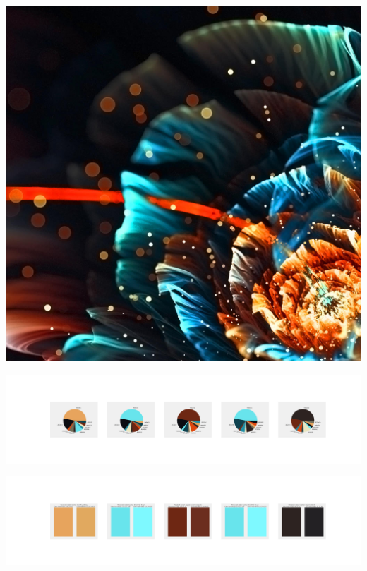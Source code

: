 \documentclass[11pt]{article}
\begin{document}
\begin{landscape}
    \begin{center}
    \includegraphics[width=\textwidth]{./nbimg/file (372).jpg}
    \end{center}

    \begin{center}
    \includegraphics[width=250mm]{./nbimg/pie-303.jpg}
    \end{center}

    \begin{center}
    \includegraphics[width=250mm]{./nbimg/peak-303.jpg}
    \end{center}
    


\end{landscape}
\end{document}
